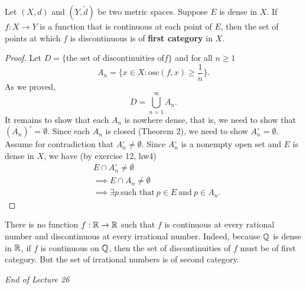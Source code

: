 \begin{theorem}[ ]
    Let \( (X,d) \) and \( (Y,\tilde{d}) \) be two metric spaces. Suppose \( E  \) is dense in \( X  \). If \( f: X \to Y  \) is a function that is continuous at each point of \( E  \), then the set of points at which \( f  \) is discontinuous is of \textbf{first category} in \( X  \).
\end{theorem}
\begin{proof}
    Let \( D = \{ \text{the set of discontinuities of} f \}  \) and for all \( n \geq 1  \) 
    \[  {A}_{n} = \{  x \in X : \text{osc}(f,x) \geq \frac{1  }{ n } \}. \]
    As we proved, 
    \[  D = \bigcup_{ n=1  }^{ \infty  }  {A}_{n}. \]
    It remains to show that each \( {A}_{n} \) is nowhere dense, that is, we need to show that \( (\overline{{A}_{n}})^{\circ} = \emptyset \). Since each \( {A}_{n} \) is closed (Theorem 2), we need to show \( {A}_{n}^{\circ} = \emptyset \). Assume for contradiction that \( {A}_{n}^{\circ} \neq \emptyset \). Since \( {A}_{n}^{\circ}  \) is a nonempty open set and \( E  \) is dense in \( X  \), we have (by exercise 12, hw4) 
    \begin{align*}
         &E \cap {A}_{n}^{\circ} \neq \emptyset \\
         &\implies E \cap {A}_{n} \neq \emptyset \\
         &\implies \exists  p \  \text{such that} \ p \in E \ \text{and} \ p \in {A}_{n}.
    \end{align*}

\end{proof}

\begin{remark}
    There is no function \( f: \mathbb{R} \to \mathbb{R}  \) such that \( f  \) is continuous at every rational number and discontinuous at every irrational number. Indeed, because \( \mathbb{Q}  \) is dense in \( \mathbb{R}  \), if \( f  \) is continuous on \( \mathbb{Q}  \), then the set of discontinuities of \( f  \) must be of first category. But the set of irrational numbers is of second category. 
\end{remark}

\begin{center}
    \textit{End of Lecture 26} 
\end{center}
